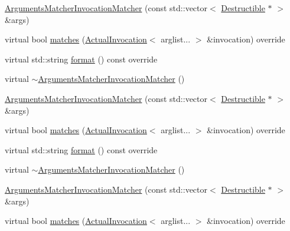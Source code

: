 \begin{DoxyCompactItemize}
\item 
\mbox{\hyperlink{structfakeit_1_1ArgumentsMatcherInvocationMatcher_aad6c81f17ede575178414c2c7581e800}{Arguments\+Matcher\+Invocation\+Matcher}} (const std\+::vector$<$ \mbox{\hyperlink{classfakeit_1_1Destructible}{Destructible}} $\ast$ $>$ \&args)
\item 
virtual bool \mbox{\hyperlink{structfakeit_1_1ArgumentsMatcherInvocationMatcher_a7da0c96fb549a6bb4b944214514e4ca8}{matches}} (\mbox{\hyperlink{structfakeit_1_1ActualInvocation}{Actual\+Invocation}}$<$ arglist... $>$ \&invocation) override
\item 
virtual std\+::string \mbox{\hyperlink{structfakeit_1_1ArgumentsMatcherInvocationMatcher_a5174a0a696bbbc3090b4b1d7937c02f9}{format}} () const override
\item 
virtual \mbox{\hyperlink{structfakeit_1_1ArgumentsMatcherInvocationMatcher_a7674a20f37f1b19f7597eb24d9deb392}{$\sim$\+Arguments\+Matcher\+Invocation\+Matcher}} ()
\item 
\mbox{\hyperlink{structfakeit_1_1ArgumentsMatcherInvocationMatcher_aad6c81f17ede575178414c2c7581e800}{Arguments\+Matcher\+Invocation\+Matcher}} (const std\+::vector$<$ \mbox{\hyperlink{classfakeit_1_1Destructible}{Destructible}} $\ast$ $>$ \&args)
\item 
virtual bool \mbox{\hyperlink{structfakeit_1_1ArgumentsMatcherInvocationMatcher_a7da0c96fb549a6bb4b944214514e4ca8}{matches}} (\mbox{\hyperlink{structfakeit_1_1ActualInvocation}{Actual\+Invocation}}$<$ arglist... $>$ \&invocation) override
\item 
virtual std\+::string \mbox{\hyperlink{structfakeit_1_1ArgumentsMatcherInvocationMatcher_a5174a0a696bbbc3090b4b1d7937c02f9}{format}} () const override
\item 
virtual \mbox{\hyperlink{structfakeit_1_1ArgumentsMatcherInvocationMatcher_a7674a20f37f1b19f7597eb24d9deb392}{$\sim$\+Arguments\+Matcher\+Invocation\+Matcher}} ()
\item 
\mbox{\hyperlink{structfakeit_1_1ArgumentsMatcherInvocationMatcher_aad6c81f17ede575178414c2c7581e800}{Arguments\+Matcher\+Invocation\+Matcher}} (const std\+::vector$<$ \mbox{\hyperlink{classfakeit_1_1Destructible}{Destructible}} $\ast$ $>$ \&args)
\item 
virtual bool \mbox{\hyperlink{structfakeit_1_1ArgumentsMatcherInvocationMatcher_a7da0c96fb549a6bb4b944214514e4ca8}{matches}} (\mbox{\hyperlink{structfakeit_1_1ActualInvocation}{Actual\+Invocation}}$<$ arglist... $>$ \&invocation) override
\item 

\end{DoxyCompactItemize}
